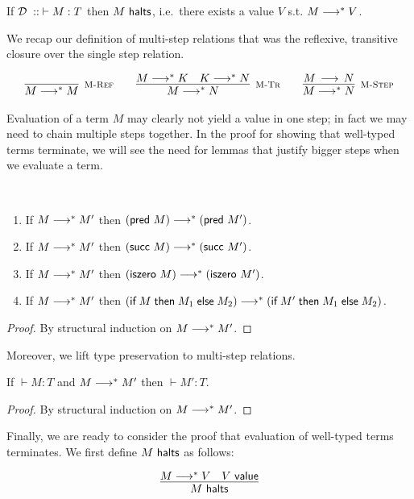 \begin{theorem}
If $\mathbin{{\mathcal{D}} \; :: \;  \vdash M : T }$ then $M ~\mathsf{halts}$, i.e.~there exists a value $V$ s.t. $M
\longrightarrow^* V$.
\end{theorem}

We recap our definition of multi-step relations that was the
reflexive, transitive closure over the single step relation.

\[
\begin{array}{c@{\qquad}c@{\qquad}c}
\infer[\MRef]{M \MSteps M}{} &
\infer[\MTr]{M \MSteps N}{M \MSteps K & K \MSteps N} &
\infer[\MStep]{M \MSteps N}{M \Steps N}
\end{array}
\]

Evaluation of a term $M$ may clearly not yield a value in one step; in fact we may need to chain multiple steps together.
In the proof for showing that well-typed terms terminate, we will see the need for lemmas that justify bigger steps when we evaluate a term.

\begin{lemma}~
  \begin{enumerate}
  \item If $M \longrightarrow^* M'$ then $(\textsf{pred}~M) \longrightarrow^* (\textsf{pred}~M')$.
  \item If $M \longrightarrow^* M'$ then $(\textsf{succ}~M) \longrightarrow^* (\textsf{succ}~M')$.
  \item If $M \longrightarrow^* M'$ then $(\textsf{iszero}~M) \longrightarrow^* (\textsf{iszero}~M')$.
  \item If $M \longrightarrow^* M'$ then $(\textsf{if\;} M \textsf{\;then\;} M_1 \textsf{\;else\;} M_2) \longrightarrow^* (\textsf{if\;} M' \textsf{\;then\;} M_1 \textsf{\;else\;} M_2)$.
  \end{enumerate}
\end{lemma}
\begin{proof}
By structural induction  on $M \longrightarrow^* M'$.
\end{proof}

Moreover, we lift type preservation to multi-step relations.

\begin{lemma}
If $\vdash M : T$ and $M \longrightarrow^* M'$ then $\vdash M':T$.
\end{lemma}
\begin{proof}
By structural induction on $M \longrightarrow^* M'$.
\end{proof}

Finally, we are ready to consider the proof that evaluation of well-typed terms
terminates. We first define $M ~\mathsf{halts}$ as follows:

\[
\begin{array}{c}
\infer{M \Halts}{M \MSteps V & V \Value }
\end{array}
\]



